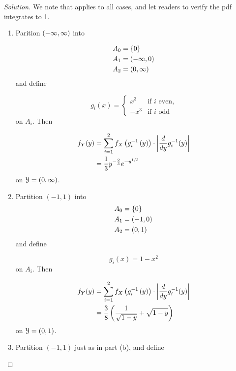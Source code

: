\documentclass[12pt,letterpaper,reqno]{amsart}
\numberwithin{equation}{subsection}
\begin{document}
\begin{proof}[Solution] We note that \cite[Theorem 2.1.8 on page 53]{Berger-Casella} applies to all cases, and let readers to verify the pdf integrates to 1.

\begin{enumerate}[label=(\alph*),leftmargin=*]
    \item Parition $\left( {-\infty}, {\infty} \right)$ into
    
    \begin{align*}
        A_0 &= \left\{ {0} \right\} \\
        A_1 &= \left( {-\infty}, {0} \right) \\
        A_2 &= \left( {0}, {\infty} \right)
    \end{align*}
    and define
    
    \[ g_i(x) = \left\{ \begin{array}{cl}
         x^3 & \mbox{if $i$ even,}\\
         -x^3 & \mbox{if $i$ odd}
    \end{array} \right. \]
    on $A_i$. Then
    
    \begin{align*}
        {f_Y}\! \left( {y} \right) &= \sum_{i=1}^2 f_X \left( g_i^{-1} \left( y \right) \right) \cdot \left\lvert{\frac{d{}}{d{y}} g_i^{-1}(y)}\right\rvert \\
        &= \frac{1}{3} y^{-\frac{2}{3}} e^{-y^{1/3}}
    \end{align*}
    on $\mathcal{{Y}} = (0, \infty)$.
    
    \item Partition $(-1, 1)$ into     
    \begin{align*}
        A_0 &= \left\{ {0} \right\} \\
        A_1 &= \left( {-1}, {0} \right) \\
        A_2 &= \left( {0}, {1} \right)
    \end{align*}
    and define
    
    \[ g_i(x) = 1-x^2 \]
    on $A_i$. Then
    
        \begin{align*}
        {f_Y}\! \left( {y} \right) &= \sum_{i=1}^2 f_X \left( g_i^{-1} \left( y \right) \right) \cdot \left\lvert{\frac{d{}}{d{y}} g_i^{-1}(y)}\right\rvert \\
        &= \frac{3}{8} \left( \frac{1}{ \sqrt{1-y}} + \sqrt{1-y} \right)
    \end{align*}
    on $\mathcal{{Y}} = (0, 1)$.
    
    \item Partition $(-1,1)$ just as in part (b), and define
    

\end{enumerate}
\end{proof}
\end{document}
